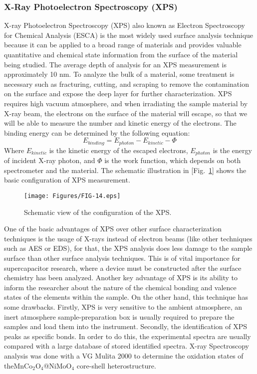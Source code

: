 \documentclass[reprint,amsmath,amssymb,aps,floatfix,
]{revtex4-2}
\begin{document}
\subsubsection{X-Ray Photoelectron Spectroscopy (XPS)}
X-ray Photoelectron Spectroscopy (XPS) also known as Electron Spectroscopy for Chemical Analysis (ESCA) is the most widely used surface analysis technique because it can be applied to a broad range of materials and provides valuable quantitative and chemical state information from the surface of the material being studied. The average depth of analysis for an XPS measurement is approximately 10 nm. To analyze the bulk of a material, some treatment is necessary such as fracturing, cutting, and scraping to remove the contamination on the surface and expose the deep layer for further characterization. XPS requires high vacuum atmosphere, and when irradiating the sample material by X-ray beam, the electrons on the surface of the material will escape, so that we will be able to measure the number and kinetic energy of the electrons. The binding energy can be determined by the following equation:
\begin{equation}
    E_{binding} = E_{photon} - E_{kinetic} - \varPhi 
\end{equation}
Where $E_{kinetic}$ is the kinetic energy of the escaped electrons, $E_{photon}$ is the energy of incident X-ray photon, and $\varPhi$ is the work function, which depends on both spectrometer and the material. The schematic illustration in [Fig.~\ref{fig:fig14}] shows the basic configuration of XPS measurement.
\begin{figure}[b]
    \centering
    \texttt{[image: Figures/FIG-14.eps]}
    \caption{\label{fig:fig14}Schematic view of the configuration of the XPS.}
    \end{figure}
One of the basic advantages of XPS over other surface characterization techniques is the usage of X-rays instead of electron beams (like other techniques such as AES or EDS), for that, the XPS analysis does less damage to the sample surface than other surface analysis techniques. This is of vital importance for supercapacitor research, where a device must be constructed after the surface chemistry has been analyzed. Another key advantage of XPS is its ability to inform the researcher about the nature of the chemical bonding and valence states of the elements within the sample. On the other hand, this technique has some drawbacks. Firstly, XPS is very sensitive to the ambient atmosphere, an inert atmosphere sample-preparation box is usually required to prepare the samples and load them into the instrument. Secondly, the identification of XPS peaks as specific bonds. In order to do this, the experimental spectra are usually compared with a large database of stored identified spectra. X-ray Spectroscopy analysis was done with a VG Mulita 2000 to determine the oxidation states of theMnCo$_2$O$_4$@NiMoO$_4$ core-shell heterostructure.
\end{document}
